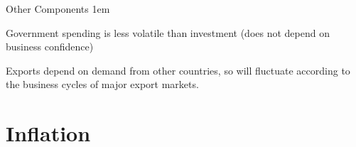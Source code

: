 \documentclass[11pt,aspectratio=43,usenames,dvipsnames]{beamer}
\let\olditemize=\itemize
\let\endolditemize=\enditemize
\renewenvironment{itemize}{\olditemize \itemsep1em}{\endolditemize}
\theoremstyle{definition}
\begin{document}
\begin{frame}{Other Components}
\label{slide:Other_Components}
    \begin{itemize}
        \item Government spending is \alert{less volatile} than investment (does not depend on business confidence)
        \item Exports depend on \alert{demand from other countries}, so will fluctuate according to the business cycles of major export markets.
    \end{itemize}
\end{frame}

\section[\faMoney]{Inflation}
\label{sec:Inflation}
\end{document}
